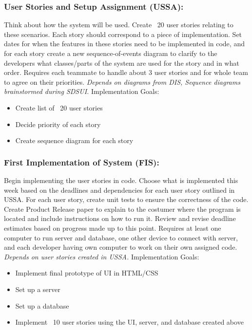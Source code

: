 \documentclass[12pt]{article}
\begin{document}
\subsubsection{User Stories and Setup Assignment (USSA):}
Think about how the system will be used. Create ~20 user stories relating to
these scenarios. Each story should correspond to a piece of implementation. Set
dates for when the features in these stories need to be implemented in code, and
for each story create a new sequence-of-events diagram to clarify to the
developers what classes/parts of the system are used for the story and in what
order. Requires each teammate to handle about 3 user stories and for whole team
to agree on their priorities. \textit{Depends on diagrams from DIS, Sequence diagrams
brainstormed during SDSUI.}
Implementation Goals:
\begin{itemize}
  \item Create list of ~20 user stories
  \item Decide priority of each story
  \item Create sequence diagram for each story
\end{itemize}

\subsubsection{First Implementation of System (FIS): }
Begin implementing the user stories in code. Choose what is implemented this
week based on the deadlines and dependencies for each user story outlined in
USSA. For each user story, create unit tests to ensure the correctness of the
code. Create Product Release paper to explain to the costumer where the program
is located and include instructions on how to run it. Review and revise deadline
estimates based on progress made up to this point. Requires at least one
computer to run server and database, one other device to connect with server,
and each developer having own computer to work on their own assigned code.
\textit{Depends on user stories created in USSA.}
Implementation Goals:
\begin{itemize}
  \item Implement final prototype of UI in HTML/CSS
  \item Set up a server
  \item Set up a database
  \item Implement ~10 user stories using the UI, server, and database created above
\end{itemize}
\end{document}
